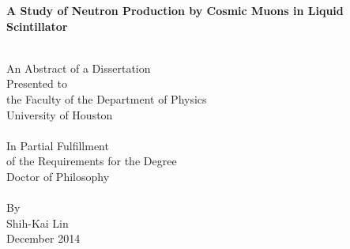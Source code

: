 \begin{center}



\begin{description}
\bigskip
\bigskip
\bigskip
\bigskip
\bigskip
\end{description}

{ \huge \bfseries A Study of Neutron Production by Cosmic Muons in Liquid Scintillator \\[0.4cm] }

\HRule \\[1.0cm]

An Abstract of a Dissertation\\
Presented to\\
the Faculty of the Department of Physics\\
University of Houston\\[1.0cm]

\HRule \\[1.0cm]

In Partial Fulfillment\\
of the Requirements for the Degree\\
Doctor of Philosophy\\[1.0cm]

\HRule \\[1.0cm]

By\\
Shih-Kai Lin\\
December 2014




\end{center}